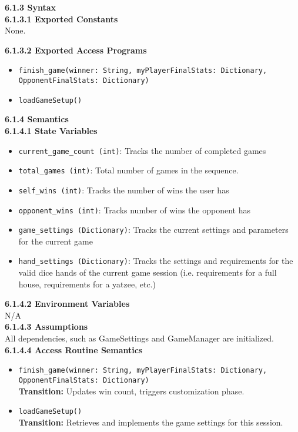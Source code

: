 \documentclass[12pt, titlepage]{article}
\begin{document}
\noindent \textbf{6.1.3 Syntax}\\
\textbf{6.1.3.1 Exported Constants}\\
None.  

\noindent \textbf{6.1.3.2 Exported Access Programs}
\begin{itemize}
    \item \texttt{finish\_game(winner: String, myPlayerFinalStats: Dictionary, OpponentFinalStats: Dictionary)}
    \item \texttt{loadGameSetup()}
\end{itemize}

\textbf{6.1.4 Semantics}\\
\textbf{6.1.4.1 State Variables}\\
\begin{itemize}
    \item \texttt{current\_game\_count (int)}: Tracks the number of completed games
    \item \texttt{total\_games (int)}: Total number of games in the sequence.
    \item \texttt{self\_wins (int)}: Tracks the number of wins the user has 
    \item \texttt{opponent\_wins (int)}: Tracks number of wins the opponent has
    \item \texttt{game\_settings (Dictionary)}: Tracks the current settings and parameters for the current game
    \item \texttt{hand\_settings (Dictionary)}: Tracks the settings and requirements for the valid dice hands of the current game session (i.e. requirements for a full house, requirements for a yatzee, etc.)

\end{itemize}

\textbf{6.1.4.2 Environment Variables}\\

N/A\\

\textbf{6.1.4.3 Assumptions}\\

All dependencies, such as GameSettings and GameManager are initialized.\\

\textbf{6.1.4.4 Access Routine Semantics}
\begin{itemize}

    \item \texttt{finish\_game(winner: String, myPlayerFinalStats: Dictionary, OpponentFinalStats: Dictionary)}\\
    \textbf{Transition:} Updates win count, triggers customization phase.
    
    \item \texttt{loadGameSetup()}\\
    \textbf{Transition:} Retrieves and implements the game settings for this session.

\end{itemize}
\end{document}
